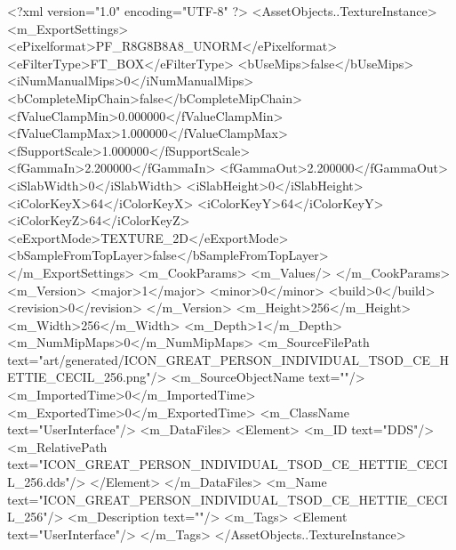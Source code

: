 <?xml version="1.0" encoding="UTF-8" ?>
<AssetObjects..TextureInstance>
	<m_ExportSettings>
		<ePixelformat>PF_R8G8B8A8_UNORM</ePixelformat>
		<eFilterType>FT_BOX</eFilterType>
		<bUseMips>false</bUseMips>
		<iNumManualMips>0</iNumManualMips>
		<bCompleteMipChain>false</bCompleteMipChain>
		<fValueClampMin>0.000000</fValueClampMin>
		<fValueClampMax>1.000000</fValueClampMax>
		<fSupportScale>1.000000</fSupportScale>
		<fGammaIn>2.200000</fGammaIn>
		<fGammaOut>2.200000</fGammaOut>
		<iSlabWidth>0</iSlabWidth>
		<iSlabHeight>0</iSlabHeight>
		<iColorKeyX>64</iColorKeyX>
		<iColorKeyY>64</iColorKeyY>
		<iColorKeyZ>64</iColorKeyZ>
		<eExportMode>TEXTURE_2D</eExportMode>
		<bSampleFromTopLayer>false</bSampleFromTopLayer>
	</m_ExportSettings>
	<m_CookParams>
		<m_Values/>
	</m_CookParams>
	<m_Version>
		<major>1</major>
		<minor>0</minor>
		<build>0</build>
		<revision>0</revision>
	</m_Version>
	<m_Height>256</m_Height>
	<m_Width>256</m_Width>
	<m_Depth>1</m_Depth>
	<m_NumMipMaps>0</m_NumMipMaps>
	<m_SourceFilePath text="art/generated/ICON_GREAT_PERSON_INDIVIDUAL_TSOD_CE_HETTIE_CECIL_256.png"/>
	<m_SourceObjectName text=""/>
	<m_ImportedTime>0</m_ImportedTime>
	<m_ExportedTime>0</m_ExportedTime>
	<m_ClassName text="UserInterface"/>
	<m_DataFiles>
		<Element>
			<m_ID text="DDS"/>
			<m_RelativePath text="ICON_GREAT_PERSON_INDIVIDUAL_TSOD_CE_HETTIE_CECIL_256.dds"/>
		</Element>
	</m_DataFiles>
	<m_Name text="ICON_GREAT_PERSON_INDIVIDUAL_TSOD_CE_HETTIE_CECIL_256"/>
	<m_Description text=""/>
	<m_Tags>
		<Element text="UserInterface"/>
	</m_Tags>
</AssetObjects..TextureInstance>
